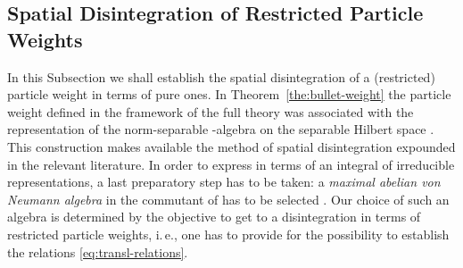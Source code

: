 \documentclass[a4paper,a4paper]{article}
\numberwithin{equation}{section}
\providecommand{\Mfrak}{\mathfrak{M}}
\providecommand{\Hbullet}{\mathscr{H}^\bullet}
\providecommand{\Abullet}{\mathfrak{A}^\bullet}
\theoremstyle{definition}
\theoremstyle{plain}
\theoremstyle{remark}
\theoremstyle{assumption}
\providecommand{\scp}[2]{\langle #1 \vert #2 \rangle}
\begin{document}
\subsection{Spatial Disintegration of Restricted Particle Weights}
  \label{subsec:spatial-disintegration}
  
  In this Subsection we shall establish the spatial disintegration of
  a (restricted) particle weight in terms of pure ones. In
  Theorem~\ref{the:bullet-weight} the particle weight \myHighlight{$\scp{~.~}{~.~}$}\coordHE{}
  defined in the framework of the full theory was associated with the
  representation \myHighlight{$( \pi^\bullet , \Hbullet )$}\coordHE{} of the norm-separable
  \coordHE{}-algebra \myHighlight{$\Abullet$}\coordHE{} on the separable Hilbert space \myHighlight{$\Hbullet$}\coordHE{}.
  This construction makes available the method of spatial
  disintegration expounded in the relevant literature. In order to
  express \myHighlight{$\pi^\bullet$}\coordHE{} in terms of an integral of irreducible
  representations, a last preparatory step has to be taken: a
  \emph{maximal abelian von Neumann algebra} \myHighlight{$\Mfrak$}\coordHE{} in the commutant
  of \myHighlight{$\pi^\bullet ( \Abullet )$}\coordHE{} has to be selected
  \cite[Theorem~8.5.2]{dixmier:1982}. Our choice of such an algebra is
  determined by the objective to get to a disintegration in terms of
  restricted particle weights, i.\,e., one has to provide for the
  possibility to establish the relations \eqref{eq:transl-relations}.
  
\end{document}
